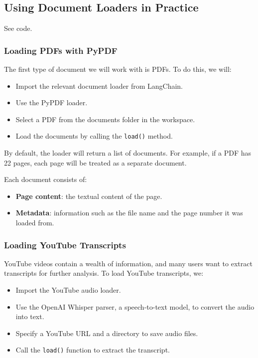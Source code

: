 \documentclass{article}
\begin{document}
\subsection{Using Document Loaders in Practice}

See code.

\subsubsection{Loading PDFs with PyPDF}
The first type of document we will work with is PDFs. To do this, we will:
\begin{itemize}
    \item Import the relevant document loader from LangChain.
    \item Use the PyPDF loader.
    \item Select a PDF from the documents folder in the workspace.
    \item Load the documents by calling the \texttt{load()} method.
\end{itemize}

By default, the loader will return a list of documents. For example, if a PDF has 22 pages, each page will be treated as a separate document. 

Each document consists of:
\begin{itemize}
    \item \textbf{Page content}: the textual content of the page.
    \item \textbf{Metadata}: information such as the file name and the page number it was loaded from.
\end{itemize}

\subsubsection{Loading YouTube Transcripts}

YouTube videos contain a wealth of information, and many users want to extract transcripts for further analysis. To load YouTube transcripts, we:

\begin{itemize}
    \item Import the YouTube audio loader.
    \item Use the OpenAI Whisper parser, a speech-to-text model, to convert the audio into text.
    \item Specify a YouTube URL and a directory to save audio files.
    \item Call the \texttt{load()} function to extract the transcript.
\end{itemize}
\end{document}
